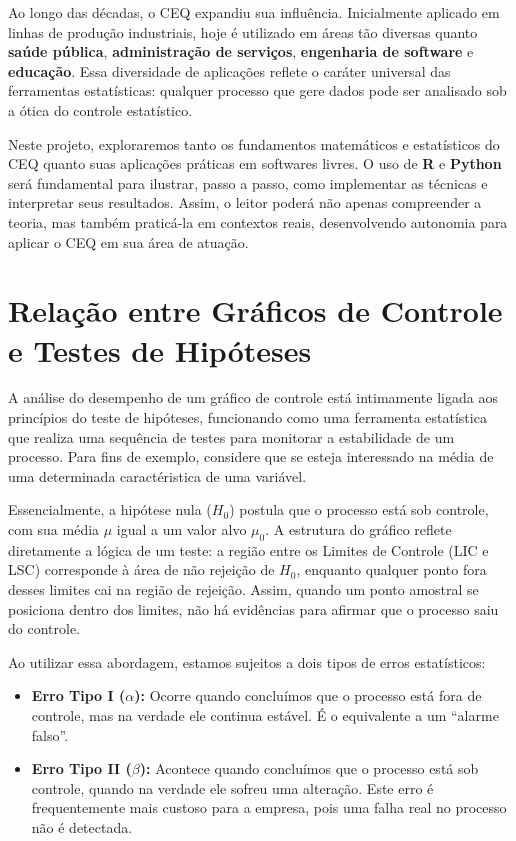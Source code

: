 \documentclass[
  portuguese,
  11pt,
  a4paper,
  DIV=11,
  numbers=noendperiod]{scrreprt}
\providecommand{\tightlist}{%
  \setlength{\itemsep}{0pt}\setlength{\parskip}{0pt}}
\begin{document}
Ao longo das décadas, o CEQ expandiu sua influência. Inicialmente
aplicado em linhas de produção industriais, hoje é utilizado em áreas
tão diversas quanto \textbf{saúde pública}, \textbf{administração de
serviços}, \textbf{engenharia de software} e \textbf{educação}. Essa
diversidade de aplicações reflete o caráter universal das ferramentas
estatísticas: qualquer processo que gere dados pode ser analisado sob a
ótica do controle estatístico.

Neste projeto, exploraremos tanto os fundamentos matemáticos e
estatísticos do CEQ quanto suas aplicações práticas em softwares livres.
O uso de \textbf{R} e \textbf{Python} será fundamental para ilustrar,
passo a passo, como implementar as técnicas e interpretar seus
resultados. Assim, o leitor poderá não apenas compreender a teoria, mas
também praticá-la em contextos reais, desenvolvendo autonomia para
aplicar o CEQ em sua área de atuação.

\section{Relação entre Gráficos de Controle e Testes de
Hipóteses}\label{relauxe7uxe3o-entre-gruxe1ficos-de-controle-e-testes-de-hipuxf3teses}

A análise do desempenho de um gráfico de controle está intimamente
ligada aos princípios do teste de hipóteses, funcionando como uma
ferramenta estatística que realiza uma sequência de testes para
monitorar a estabilidade de um processo. Para fins de exemplo, considere
que se esteja interessado na média de uma determinada caractéristica de
uma variável.

Essencialmente, a hipótese nula (\(H_0\)) postula que o processo está
sob controle, com sua média \(\mu\) igual a um valor alvo \(\mu_0\). A
estrutura do gráfico reflete diretamente a lógica de um teste: a região
entre os Limites de Controle (LIC e LSC) corresponde à área de não
rejeição de \(H_0\), enquanto qualquer ponto fora desses limites cai na
região de rejeição. Assim, quando um ponto amostral se posiciona dentro
dos limites, não há evidências para afirmar que o processo saiu do
controle.

Ao utilizar essa abordagem, estamos sujeitos a dois tipos de erros
estatísticos:

\begin{itemize}
\tightlist
\item
  \textbf{Erro Tipo I (\(\alpha\)):} Ocorre quando concluímos que o
  processo está fora de controle, mas na verdade ele continua estável. É
  o equivalente a um ``alarme falso''.
\item
  \textbf{Erro Tipo II (\(\beta\)):} Acontece quando concluímos que o
  processo está sob controle, quando na verdade ele sofreu uma
  alteração. Este erro é frequentemente mais custoso para a empresa,
  pois uma falha real no processo não é detectada.
\end{itemize}
\end{document}
